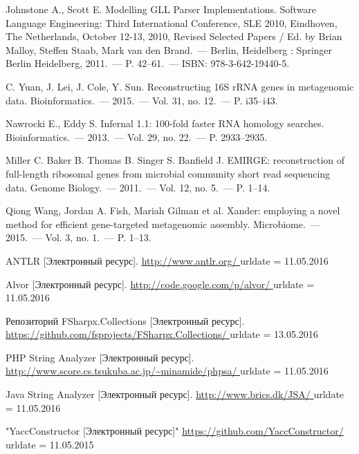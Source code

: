 \begin{thebibliography}{99}
  Johnstone A., Scott E.
  Modelling GLL Parser Implementations.
  Software Language Engineering: Third International Conference, SLE 2010, Eindhoven, The Netherlands, October 12-13, 2010, Revised Selected Papers / Ed. by Brian Malloy, Steffen Staab, Mark van den Brand.~--- Berlin, Heidelberg : Springer Berlin Heidelberg, 2011.~--- P. 42–61.~--- ISBN: 978-3-642-19440-5.

  C. Yuan, J. Lei, J. Cole, Y. Sun.
  Reconstructing 16S rRNA genes in metagenomic data.
  Bioinformatics.~--- 2015.~--- Vol. 31, no. 12.~--- P. i35–i43.
    
  Nawrocki E., Eddy S. 
  Infernal 1.1: 100-fold faster RNA homology searches.
  Bioinformatics.~--- 2013.~--- Vol. 29, no. 22.~--- P. 2933–2935.

  Miller C. Baker B. Thomas B. Singer S. Banfield J.
  EMIRGE: reconstruction of full-length ribosomal genes from microbial community short read sequencing data.
  Genome Biology.~--- 2011.~--- Vol. 12, no. 5.~--- P. 1–14.

  Qiong Wang, Jordan A. Fish, Mariah Gilman et al.
  Xander: employing a novel method for efficient gene-targeted metagenomic assembly.
  Microbiome.~--- 2015.~--- Vol. 3, no. 1.~--- P. 1–13.
                                                     
  ANTLR [Электронный ресурс].
  \url{http://www.antlr.org/ }
  urldate = {11.05.2016}

  Alvor [Электронный ресурс].
  \url{ http://code.google.com/p/alvor/ }
  urldate = {11.05.2016}


  Репозиторий FSharpx.Collections [Электронный ресурс].
  \url{ https://github.com/fsprojects/FSharpx.Collections/ }
  urldate = {13.05.2016}

  PHP String Analyzer [Электронный ресурс].
  \url{ http://www.score.cs.tsukuba.ac.jp/~minamide/phpsa/ }
  urldate = {11.05.2016}

  Java String Analyzer [Электронный ресурс].
  \url{ http://www.brics.dk/JSA/ }
  urldate = {11.05.2016}


  "YaccConstructor [Электронный ресурс]"
  \url{https://github.com/YaccConstructor/ }
  urldate = {11.05.2015}


\end{thebibliography}

